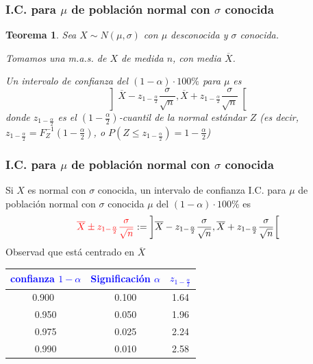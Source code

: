\documentclass[12pt,t]{beamer}
\newcommand{\red}[1]{\textcolor{red}{#1}}
\newcommand{\blue}[1]{\textcolor{blue}{#1}}
\renewcommand{\leq}{\leqslant}
\theoremstyle{plain}
\newtheorem{teorema}{Teorema}
\theoremstyle{definition}
\begin{document}
\begin{frame}
\frametitle{I.C. para $\mu$ de población normal con $\sigma$ conocida}
\vspace*{-3ex}

\begin{teorema}
Sea $X\sim N(\mu,\sigma)$ con $\mu$ desconocida y $\sigma$ conocida.
\medskip

Tomamos una m.a.s. de $X$ de medida $n$, con media $\overline{X}$.
\medskip

Un intervalo de confianza  del $(1-\alpha)\cdot 100\%$ para $\mu$  es
$$
\left]\overline{X} -z_{1-\frac{\alpha}{2}} \frac{\sigma}{\sqrt{n}}, \overline{X}+z_{1-\frac{\alpha}{2}}\frac{\sigma}{\sqrt{n}}
\right[
$$
donde $z_{1-\frac{\alpha}{2}}$ es el $(1-\frac{\alpha}{2})$-cuantil de la normal  estándar $Z$ (es decir, $z_{1-\frac{\alpha}{2}}=F_Z^{-1}(1-\frac{\alpha}{2})$, o $P(Z\leq z_{1-\frac{\alpha}{2}})=1-\frac{\alpha}{2}$)
\end{teorema}


\end{frame}


\begin{frame}
\frametitle{I.C. para $\mu$ de población normal con $\sigma$ conocida}

Si $X$ es normal con $\sigma$ conocida, un intervalo de confianza  I.C. para $\mu$ de población normal con $\sigma$ conocida $\mu$ del $(1-\alpha)\cdot 100\%$ es
$$
\red{\overline{X} \pm z_{1-\frac{\alpha}{2}} \frac{\sigma}{\sqrt{n}}}:=\left]\overline{X} -z_{1-\frac{\alpha}{2}} \frac{\sigma}{\sqrt{n}}, \overline{X}+z_{1-\frac{\alpha}{2}}\frac{\sigma}{\sqrt{n}}
\right[
$$
Observad que está centrado   en $\overline{X}$
\begin{center}
\begin{tabular}{c|c|c}
\blue{confianza  $1-\alpha$} & \blue{Significación $\alpha$} & \blue{$z_{1-\frac{\alpha}{2}}$}\\
 \hline
0.900\ & 0.100 &1.64 \\   
0.950 & 0.050 & 1.96\\
0.975 & 0.025 & 2.24 \\
0.990 & 0.010 & 2.58
\end{tabular}
\end{center}

\end{frame}
\end{document}
